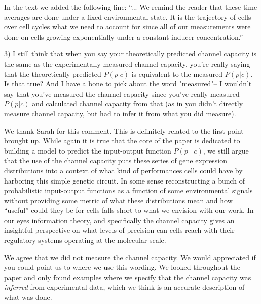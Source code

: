 In the text we added the following line:
``... We remind the reader that these time averages are done under a fixed
environmental state. It is the trajectory of cells over cell cycles what we need
to account for since all of our measurements were done on cells growing
exponentially under a constant inducer concentration.''

\begin{tcolorbox}
3)  I still think that when you say your theoretically predicted channel
capacity is the same as the experimentally measured channel capacity, you're
really saying that the theoretically predicted $P(p|c)$ is equivalent to the
measured $P(p|c)$.  Is that true?  And I have a bone to pick about the word
"measured"-- I wouldn't say that you've measured the channel capacity since
you've really measured $P(p|c)$ and calculated channel capacity from that (as in
you didn't directly measure channel capacity, but had to infer it from what you
did measure).
\end{tcolorbox}

We thank Sarah for this comment. This is definitely related to the first point
brought up. While again it is true that the core of the paper is dedicated to
building a model to predict the input-output function $P(p \mid c)$, we still
argue that the use of the channel capacity puts these series of gene expression
distributions into a context of what kind of performances cells could have by
harboring this simple genetic circuit. In some sense reconstructing a bunch of
probabilistic input-output functions as a function of some environmental signals
without providing some metric of what these distributions mean and how
``useful'' could they be for cells falls short to what we envision with our
work. In our eyes information theory, and specifically the channel capacity
gives an insightful perspective on what levels of precision can cells reach with
their regulatory systems operating at the molecular scale.

We agree that we did not measure the channel capacity. We would appreciated if
you could point us to where we use this wording. We looked throughout the paper
and only found examples where we specify that the channel capacity was
\textit{inferred} from experimental data, which we think is an accurate
description of what was done.
